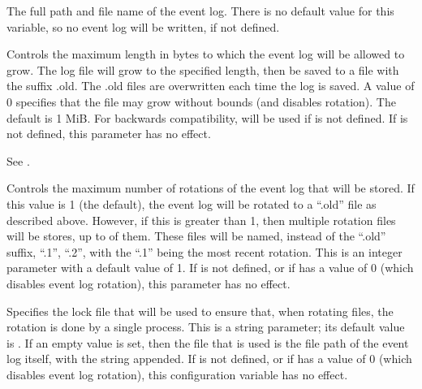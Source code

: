 \begin{description}

\label{param:EventLog}
\item[\Macro{EVENT\_LOG}]
  The full path and file name of the event log.
  There is no default value for this variable,
  so no event log will be written, if not defined.

\label{param:EventLogMaxSize}
\item[\Macro{EVENT\_LOG\_MAX\_SIZE}]
  Controls the maximum length in bytes to which the event log
  will be allowed to grow. The log file will grow to the specified length,
  then be saved to a file with the suffix .old.
  The .old  files are overwritten each time the log is saved.
  A value of 0 specifies that the file may grow without bounds (and
  disables rotation).   The default is 1 MiB.
  For backwards compatibility,  will be used if
   is not defined.
  If  is not defined, this parameter has no effect.

\label{param:MaxEventLog}
\item[\Macro{MAX\_EVENT\_LOG}]
  See .

\label{param:EventLogMaxRotations}
\item[\Macro{EVENT\_LOG\_MAX\_ROTATIONS}]
  Controls the maximum number of rotations of the event log that
  will be stored.  If this value is 1 (the default), the event log
  will be rotated to a ``.old'' file as described above.  However, if
  this is greater than 1, then multiple rotation files will be stores,
  up to  of them.  These files
  will be named, instead of the ``.old'' suffix, ``.1'', ``.2'', with
  the ``.1'' being the most recent rotation.  This is an integer
  parameter with a default value of 1.
  If  is not defined, or if
   has a value of 0 (which disables
  event log rotation), this parameter has no effect.

\label{param:EventLogRotationLock}
\item[\Macro{EVENT\_LOG\_ROTATION\_LOCK}]
  Specifies the lock file that will be used to ensure that, 
  when rotating files, the rotation is done by a single process.  This is a
  string parameter; its default value is .
  If an empty value is set, then the file that is used
  is the file path of the event log itself, 
  with the string  appended.
  If  is not defined, or if
   has a value of 0 (which disables
  event log rotation), this configuration variable has no effect.


\end{description}
